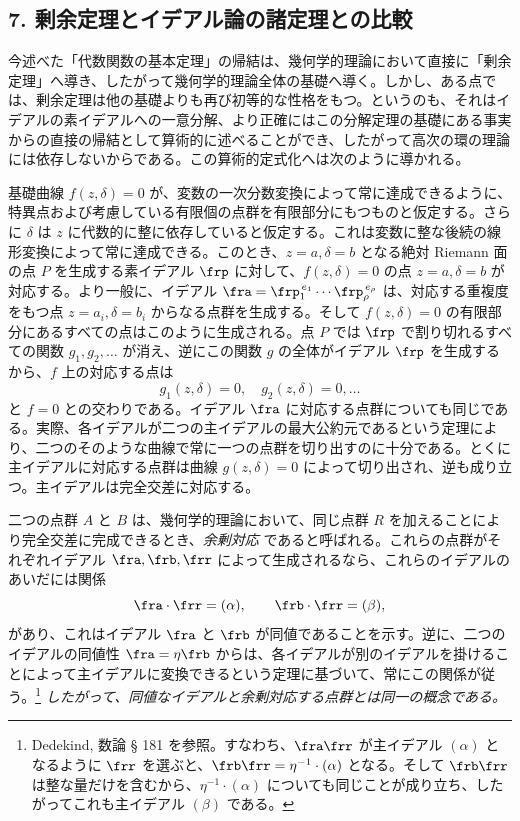 \documentclass[11pt]{article}
\begin{document}
\subsection*{7. 剰余定理とイデアル論の諸定理との比較}
今述べた「代数関数の基本定理」の帰結は、幾何学的理論において直接に「剰余定理」へ導き、したがって幾何学的理論全体の基礎へ導く。しかし、ある点では、剰余定理は他の基礎よりも再び初等的な性格をもつ。というのも、それはイデアルの素イデアルへの一意分解、より正確にはこの分解定理の基礎にある事実からの直接の帰結として算術的に述べることができ、したがって高次の環の理論には依存しないからである。この算術的定式化へは次のように導かれる。

基礎曲線 \(f(z,\delta)=0\) が、変数の一次分数変換によって常に達成できるように、特異点および考慮している有限個の点群を有限部分にもつものと仮定する。さらに \(\delta\) は \(z\) に代数的に整に依存していると仮定する。これは変数に整な後続の線形変換によって常に達成できる。このとき、\(z=a,\delta=b\) となる絶対 Riemann 面の点 \(P\) を生成する素イデアル \(\frp\) に対して、\(f(z,\delta)=0\) の点 \(z=a,\delta=b\) が対応する。より一般に、イデアル \(\fra=\frp_1^{\,e_1}\cdots\frp_\rho^{\,e_\rho}\) は、対応する重複度をもつ点 \(z=a_i,\delta=b_i\) からなる点群を生成する。そして \(f(z,\delta)=0\) の有限部分にあるすべての点はこのように生成される。点 \(P\) では \(\frp\) で割り切れるすべての関数 \(g_1,g_2,\ldots\) が消え、逆にこの関数 \(g\) の全体がイデアル \(\frp\) を生成するから、\(f\) 上の対応する点は
\[
g_1(z,\delta)=0,\quad g_2(z,\delta)=0,\ldots
\]
と \(f=0\) との交わりである。イデアル \(\fra\) に対応する点群についても同じである。実際、各イデアルが二つの主イデアルの最大公約元であるという定理により、二つのそのような曲線で常に一つの点群を切り出すのに十分である。とくに主イデアルに対応する点群は曲線 \(g(z,\delta)=0\) によって切り出され、逆も成り立つ。主イデアルは完全交差に対応する。

二つの点群 \(A\) と \(B\) は、幾何学的理論において、同じ点群 \(R\) を加えることにより完全交差に完成できるとき、\emph{余剰対応} であると呼ばれる。これらの点群がそれぞれイデアル \(\fra,\frb,\frr\) によって生成されるなら、これらのイデアルのあいだには関係
\[
\fra\cdot\frr=(\alpha),\qquad \frb\cdot\frr=(\beta),
\]
があり、これはイデアル \(\fra\) と \(\frb\) が同値であることを示す。逆に、二つのイデアルの同値性 \(\fra=\eta\frb\) からは、各イデアルが別のイデアルを掛けることによって主イデアルに変換できるという定理に基づいて、常にこの関係が従う。\footnote{Dedekind, 数論 § 181 を参照。すなわち、\(\fra\frr\) が主イデアル \((\alpha)\) となるように \(\frr\) を選ぶと、\(\frb\frr=\eta^{-1}\cdot(\alpha)\) となる。そして \(\frb\frr\) は整な量だけを含むから、\(\eta^{-1}\cdot(\alpha)\) についても同じことが成り立ち、したがってこれも主イデアル \((\beta)\) である。} \emph{したがって、同値なイデアルと余剰対応する点群とは同一の概念である。}
\end{document}
